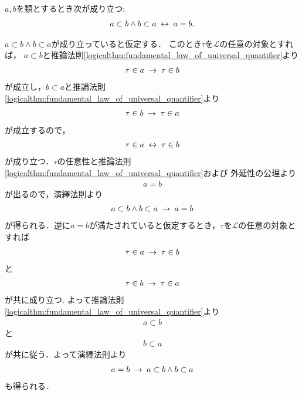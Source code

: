 	\begin{screen}
		\begin{thm}[互いに互いの部分類となる類同士は等しい]\label{thm:mutually_sub_classes_are_equivalent}
			$a,b$を類とするとき次が成り立つ:
			\begin{align}
				a \subset b \wedge b \subset a \hspace{0.25em}\leftrightarrow\hspace{0.25em} a = b.
			\end{align}
		\end{thm}
	\end{screen}
	
	\begin{sketch}
		$a \subset b \wedge b \subset a$が成り立っていると仮定する．
		このとき$\tau$を$\mathcal{L}$の任意の対象とすれば，
		$a \subset b$と推論法則\ref{logicalthm:fundamental_law_of_universal_quantifier}より
		\begin{align}
			\tau \in a \hspace{0.25em}\rightarrow\hspace{0.25em} \tau \in b
		\end{align}
		が成立し，$b \subset a$と推論法則\ref{logicalthm:fundamental_law_of_universal_quantifier}より
		\begin{align}
			\tau \in b \hspace{0.25em}\rightarrow\hspace{0.25em} \tau \in a
		\end{align}
		が成立するので，
		\begin{align}
			\tau \in a \hspace{0.25em}\leftrightarrow\hspace{0.25em} \tau \in b
		\end{align}
		が成り立つ．$\tau$の任意性と推論法則\ref{logicalthm:fundamental_law_of_universal_quantifier}および
		外延性の公理より
		\begin{align}
			a = b
		\end{align}
		が出るので，演繹法則より
		\begin{align}
			a \subset b \wedge b \subset a \hspace{0.25em}\rightarrow\hspace{0.25em} a = b
		\end{align}
		が得られる．逆に$a = b$が満たされていると仮定するとき，$\tau$を$\mathcal{L}$の任意の対象とすれば
		\begin{align}
			\tau \in a \hspace{0.25em}\rightarrow\hspace{0.25em} \tau \in b
		\end{align}
		と
		\begin{align}
			\tau \in b \hspace{0.25em}\rightarrow\hspace{0.25em} \tau \in a
		\end{align}
		が共に成り立つ. よって推論法則\ref{logicalthm:fundamental_law_of_universal_quantifier}より
		\begin{align}
			a \subset b
		\end{align}
		と
		\begin{align}
			b \subset a
		\end{align}
		が共に従う．よって演繹法則より
		\begin{align}
			a = b \hspace{0.25em}\rightarrow\hspace{0.25em} a \subset b \wedge b \subset a
		\end{align}
		も得られる．
		\QED
	\end{sketch}
	
